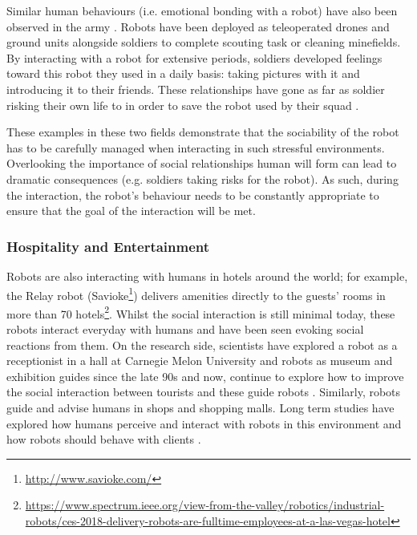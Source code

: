     Similar human behaviours (i.e. emotional bonding with a robot) have also been observed in the army \citep{singer2009wired}. Robots have been deployed as teleoperated drones and ground units alongside soldiers to complete scouting task or cleaning minefields. By interacting with a robot for extensive periods, soldiers developed feelings toward this robot they used in a daily basis: taking pictures with it and introducing it to their friends. These relationships have gone as far as soldier risking their own life to in order to save the robot used by their squad \citep{singer2009wired}. 
    
    These examples in these two fields demonstrate that the sociability of the robot has to be carefully managed when interacting in such stressful environments. Overlooking the importance of social relationships human will form can lead to dramatic consequences (e.g. soldiers taking risks for the robot). As such, during the interaction, the robot's behaviour needs to be constantly appropriate to ensure that the goal of the interaction will be met.
		
\subsubsection{Hospitality and Entertainment} 
	
	Robots are also interacting with humans in hotels around the world; for example, the Relay robot (Savioke\footnote{\url{http://www.savioke.com/}}) delivers amenities directly to the guests' rooms in more than 70 hotels\footnote{\url{https://www.spectrum.ieee.org/view-from-the-valley/robotics/industrial-robots/ces-2018-delivery-robots-are-fulltime-employees-at-a-las-vegas-hotel}}. Whilst the social interaction is still minimal today, these robots interact everyday with humans and have been seen evoking social reactions from them. On the research side, scientists have explored a robot as a receptionist in a hall at Carnegie Melon University \citep{gockley2005designing} and robots as museum and exhibition guides since the late 90s \citep{thrun1999minerva,burgard1999experiences} and now, continue to explore how to improve the social interaction between tourists and these guide robots \citep{bennewitz2005towards}. Similarly, robots guide and advise humans in shops and shopping malls. Long term studies have explored how humans perceive and interact with robots in this environment \citep{kanda2009affective} and how robots should behave with clients \citep{kanda2008will}.

